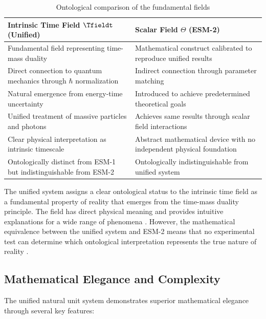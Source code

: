 	\begin{table}[ht]
		\centering
		\caption{Ontological comparison of the fundamental fields}
		\label{tab:ontological_comparison}
		\begin{tabular}{p{}|p{}}
			\hline
			\textbf{Intrinsic Time Field $\Tfieldt$ (Unified)} & \textbf{Scalar Field $\Theta$ (ESM-2)} \\
			\hline
			Fundamental field representing time-mass duality \cite{pascher_lagrangian_2025} & Mathematical construct calibrated to reproduce unified results \\
			\hline
			Direct connection to quantum mechanics through $\hbar$ normalization & Indirect connection through parameter matching \\
			\hline
			Natural emergence from energy-time uncertainty & Introduced to achieve predetermined theoretical goals \\
			\hline
			Unified treatment of massive particles and photons & Achieves same results through scalar field interactions \\
			\hline
			Clear physical interpretation as intrinsic timescale & Abstract mathematical device with no independent physical foundation \\
			\hline
			Ontologically distinct from ESM-1 but indistinguishable from ESM-2 \cite{vanFraassen1980} & Ontologically indistinguishable from unified system \\
			\hline
		\end{tabular}
	\end{table}
	
	The unified system assigns a clear ontological status to the intrinsic time field as a fundamental property of reality that emerges from the time-mass duality principle. The field has direct physical meaning and provides intuitive explanations for a wide range of phenomena \cite{pascher_pragmatic_2025}. However, the mathematical equivalence between the unified system and ESM-2 means that no experimental test can determine which ontological interpretation represents the true nature of reality \cite{Poincare1905}.
	
	\subsection{Mathematical Elegance and Complexity}
	\label{subsec:mathematical_elegance}
	
	The unified natural unit system demonstrates superior mathematical elegance through several key features:
	
